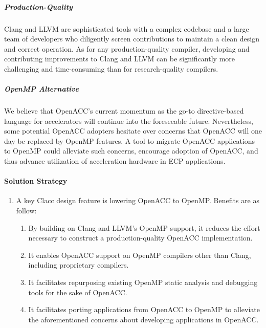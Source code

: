 \subparagraph{Production-Quality} Clang and LLVM are sophisticated tools
with a complex codebase and a large team of developers who diligently screen
contributions to maintain a clean design and correct operation.  As for any
production-quality compiler, developing and contributing improvements to
Clang and LLVM can be significantly more challenging and time-consuming than
for research-quality compilers.

\subparagraph{OpenMP Alternative} We believe that OpenACC's current
momentum as the go-to directive-based language for accelerators will
continue into the foreseeable future.  Nevertheless, some potential OpenACC
adopters hesitate over concerns that OpenACC will one day be replaced by
OpenMP features.  A tool to migrate OpenACC applications to OpenMP could
alleviate such concerns, encourage adoption of OpenACC, and thus advance
utilization of acceleration hardware in ECP applications.



\paragraph{Solution Strategy}



\begin{enumerate}

\item A key Clacc design feature is lowering OpenACC to OpenMP.
Benefits are as follow:

\begin{enumerate}

\item By building on Clang and LLVM's OpenMP support, it reduces the
effort necessary to construct a production-quality OpenACC
implementation.

\item It enables OpenACC support on OpenMP compilers other than Clang,
including proprietary compilers.

\item It facilitates repurposing existing OpenMP static analysis and
debugging tools for the sake of OpenACC.

\item It facilitates porting applications from OpenACC to OpenMP to
alleviate the aforementioned concerns about developing applications in
OpenACC.

\end{enumerate}

\end{enumerate}

